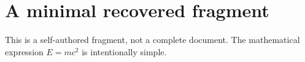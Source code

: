 \section{A minimal recovered fragment}
This is a self-authored fragment, not a complete document.
The mathematical expression $E=mc^2$ is intentionally simple.

